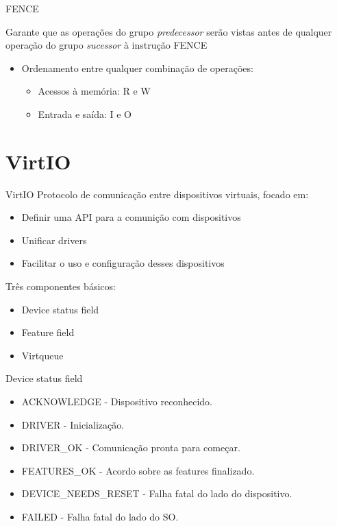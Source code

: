 \documentclass[brazil,nolapesd,aspectratio=169,noartschool]{lapesd-slides}
\begin{document}
	\begin{frame}{FENCE}

		Garante que as operações do grupo \textit{predecessor} serão vistas antes de qualquer operação
		do grupo \textit{sucessor} à instrução FENCE

		\vspace{1em}

		\begin{itemize}
			\item Ordenamento entre qualquer combinação de operações:
			\begin{itemize}
				\item Acessos à memória: R e W
				\item Entrada e saída: I e O
			\end{itemize}
		\end{itemize}
	\end{frame}


\section{VirtIO}

\begin{frame}{VirtIO}
	Protocolo de comunicação entre dispositivos virtuais, focado em:

	\begin{itemize}
		\item Definir uma API para a comunição com dispositivos
		\item Unificar drivers
		\item Facilitar o uso e configuração desses dispositivos
	\end{itemize}

	Três componentes básicos:
	\begin{itemize}
		\item Device status field
		\item Feature field
		\item Virtqueue
	\end{itemize}
\end{frame}

\begin{frame}{Device status field}
	\begin{itemize}
		\item ACKNOWLEDGE - Dispositivo reconhecido.
		\item DRIVER - Inicialização.
		\item DRIVER{\_}OK - Comunicação pronta para começar.
		\item FEATURES{\_}OK - Acordo sobre as features finalizado.
		\item DEVICE{\_}NEEDS{\_}RESET - Falha fatal do lado do dispositivo.
		\item FAILED - Falha fatal do lado do SO.
	\end{itemize}
\end{frame}
\end{document}
